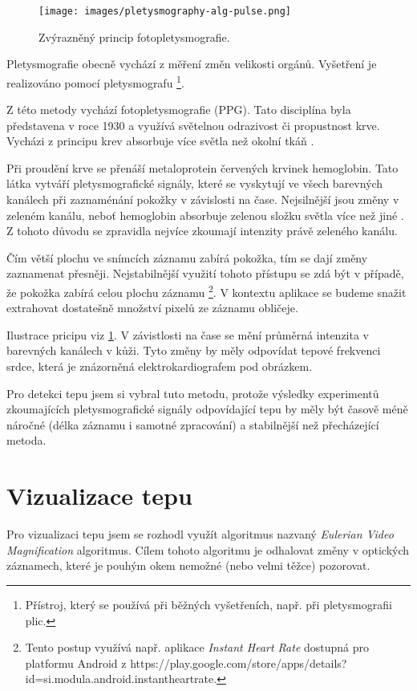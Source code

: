 \documentclass[
  digital, %
  table,   %
%
  lof,     %
  lot,     %
]{fithesis3}
\begin{document}
\begin{figure}
  \begin{center}
    \texttt{[image: images/pletysmography-alg-pulse.png]}
  \end{center}
  \caption{Zvýrazněný princip fotopletysmografie.}
  \label{fig:pletysmography-princip}
\end{figure}

Pletysmografie obecně vychází z měření změn velikosti orgánů. Vyšetření je realizováno pomocí pletysmografu \footnote{Přístroj, který se používá při běžných vyšetřeních, např. při pletysmografii plic.}.

Z této metody vychází fotopletysmografie (PPG). Tato disciplína byla představena v roce 1930 a využívá světelnou odrazivost či propustnost krve. Vycházi z principu krev absorbuje více světla než okolní tkáň \cite{photo-plethysmographic}.

Při proudění krve se přenáší metaloprotein červených krvinek hemoglobin. Tato látka vytváří pletysmografické signály, které se vyskytují ve všech barevných kanálech při zaznaménání pokožky v závislosti na čase. Nejsilnější jsou změny v zeleném kanálu, neboť hemoglobin absorbuje zelenou složku světla více než jiné \cite{green-channel-strongest}. Z tohoto důvodu se zpravidla nejvíce zkoumají intenzity právě zeleného kanálu.

Čím větší plochu ve snímcích záznamu zabírá pokožka, tím se dají změny zaznamenat přesněji. Nejstabilnější využití tohoto přístupu se zdá být v případě, že pokožka zabírá celou plochu záznamu
\footnote{Tento postup využívá např. aplikace \emph{Instant Heart Rate} dostupná pro platformu Android z https://play.google.com/store/apps/details?id=si.modula.android.instantheartrate.}. V kontextu aplikace se budeme snažit extrahovat dostatešně množství pixelů ze záznamu obličeje.

Ilustrace pricipu viz \ref{fig:pletysmography-princip}. V závistlosti na čase se mění průměrná intenzita v barevných kanálech v kůži. Tyto změny by měly odpovídat tepové frekvenci srdce, která je znázorněná elektrokardiografem pod obrázkem.

Pro detekci tepu jsem si vybral tuto metodu, protože výsledky experimentů\cite{remote-plethysmographic} zkoumajících pletysmografické signály odpovídající tepu by měly být časově méně náročné (délka záznamu i samotné zpracování) a stabilnější než přecházející metoda.

\section {Vizualizace tepu}
Pro vizualizaci tepu jsem se rozhodl využít algoritmus nazvaný \emph{Eulerian Video Magnification}\cite{eulerian-magnification} algoritmus. Cílem tohoto algoritmu je odhalovat změny v optických záznamech, které je pouhým okem nemožné (nebo velmi těžce) pozorovat.
\end{document}
